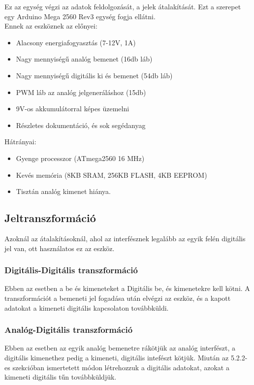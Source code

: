 Ez az egység végzi az adatok feldolgozását, a jelek átalakítását.
Ezt a szerepet egy Arduino Mega 2560 Rev3 egység fogja ellátni\cite{parmar2017design}.\\Ennek az eszköznek az előnyei:
\begin{itemize}
    \item Alacsony energiafogyasztás (7-12V, 1A)\cite{arduino_docs}
    \item Nagy mennyiségű analóg bemenet (16db láb)\cite{arduino_docs}
    \item Nagy mennyiségű digitális ki és bemenet (54db láb)\cite{arduino_docs}
    \item PWM láb az analóg jelgeneráláshoz (15db)\cite{arduino_docs}
    \item 9V-os akkumulátorral képes üzemelni \cite{arduino_docs}
    \item Részletes dokumentáció, és sok segédanyag
\end{itemize}
Hátrányai:
\begin{itemize}
    \item Gyenge processzor (ATmega2560 16 MHz)\cite{arduino_docs}
    \item Kevés memória (8KB SRAM, 256KB FLASH, 4KB EEPROM)\cite{arduino_docs}
    \item Tisztán analóg kimenet hiánya.
\end{itemize}
\subsection{Jeltranszformáció}
Azoknál az átalakításoknál, ahol az interfésznek legalább az egyik felén digitális jel van, ott használatos ez az eszköz.
\subsubsection{Digitális-Digitális transzformáció}
Ebben az esetben a be és kimeneteket a Digitális be, és kimenetekre kell kötni. A transzformációt a bemeneti jel fogadása után elvégzi az eszköz, és a kapott adatokat a kimeneti digitális kapcsolaton továbbküldi.
\subsubsection{Analóg-Digitális transzformáció}
Ebben az esetben az egyik analóg bemenetre rákötjük az analóg interfészt, a digitális kimenethez pedig a kimeneti, digitális intefészt kötjük. Miután az 5.2.2-es szekcióban ismertetett módon létrehozzuk a digitális adatokat, azokat a kimeneti digitális tűn továbbküldjük.
